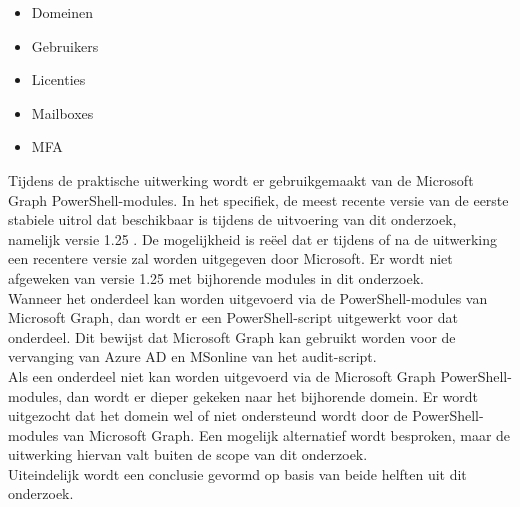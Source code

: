 \begin{itemize}
    \item Domeinen
    \item Gebruikers
    \item Licenties
    \item Mailboxes
    \item \ac{MFA}
\end{itemize}

Tijdens de praktische uitwerking wordt er gebruikgemaakt van de Microsoft Graph PowerShell-modules. In het specifiek, de meest recente versie van de eerste stabiele uitrol dat beschikbaar is tijdens de uitvoering van dit onderzoek, namelijk versie 1.25 \autocite{Microsoft2023k}. De mogelijkheid is reëel dat er tijdens of na de uitwerking een recentere versie zal worden uitgegeven door Microsoft. Er wordt niet afgeweken van versie 1.25 met bijhorende modules in dit onderzoek. \\  

Wanneer het onderdeel kan worden uitgevoerd via de PowerShell-modules van Microsoft Graph, dan wordt er een PowerShell-script uitgewerkt voor dat onderdeel. Dit bewijst dat Microsoft Graph kan gebruikt worden voor de vervanging van Azure \ac{AD} en MSonline van het audit-script. \\

Als een onderdeel niet kan worden uitgevoerd via de Microsoft Graph PowerShell-modules, dan wordt er dieper gekeken naar het bijhorende domein. Er wordt uitgezocht dat het domein wel of niet ondersteund wordt door de PowerShell-modules van Microsoft Graph. Een mogelijk alternatief wordt besproken, maar de uitwerking hiervan valt buiten de scope van dit onderzoek. \\

Uiteindelijk wordt een conclusie gevormd op basis van beide helften uit dit onderzoek. 

